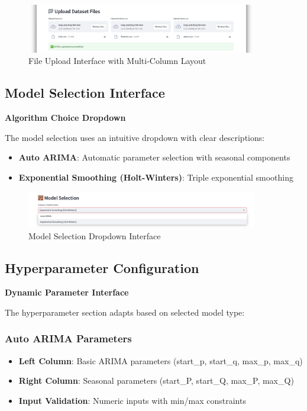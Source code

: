 \begin{figure}[H]
    \centering
    \includegraphics[width=0.9\textwidth]{Images/04GUIAndUserInterface/FileUpload.png}
    \caption{File Upload Interface with Multi-Column Layout}
    \label{fig:file_upload}
\end{figure}

\subsection{Model Selection Interface}

\textbf{Algorithm Choice Dropdown}

The model selection uses an intuitive dropdown with clear descriptions:

\begin{itemize}
    \item \textbf{Auto ARIMA}: Automatic parameter selection with seasonal components
    \item \textbf{Exponential Smoothing (Holt-Winters)}: Triple exponential smoothing
\end{itemize}

\begin{figure}[H]
    \centering
    \includegraphics[width=0.9\textwidth]{Images/04GUIAndUserInterface/ModelSelection.png}
    \caption{Model Selection Dropdown Interface}
    \label{fig:model_selection}
\end{figure}

\subsection{Hyperparameter Configuration}

\textbf{Dynamic Parameter Interface}

The hyperparameter section adapts based on selected model type:

\subsubsection{Auto ARIMA Parameters}
\begin{itemize}
    \item \textbf{Left Column}: Basic ARIMA parameters (start\_p, start\_q, max\_p, max\_q)
    \item \textbf{Right Column}: Seasonal parameters (start\_P, start\_Q, max\_P, max\_Q)
    \item \textbf{Input Validation}: Numeric inputs with min/max constraints
\end{itemize}

